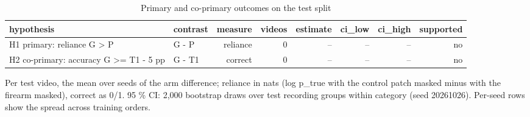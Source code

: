\begin{table}[htbp]
\centering
\scriptsize
\caption{Primary and co-primary outcomes on the test split}\label{tab:R4}
\begin{adjustbox}{max width=\textwidth}
\begin{tabular}{llrrrrrr}
\toprule
hypothesis & contrast & measure & videos & estimate & ci\_\allowbreak{}low & ci\_\allowbreak{}high & supported \\
\midrule
H1 primary: reliance G > P & G - P & reliance & 0 & -- & -- & -- & no \\
H2 co-primary: accuracy G >= T1 - 5 pp & G - T1 & correct & 0 & -- & -- & -- & no \\
\bottomrule
\end{tabular}
\end{adjustbox}
\par\smallskip\parbox{\textwidth}{\footnotesize Per test video, the mean over seeds of the arm difference; reliance in nats (log p\_true with the control patch masked minus with the firearm masked), correct as 0/1. 95 \% CI: 2,000 bootstrap draws over test recording groups within category (seed 20261026). Per-seed rows show the spread across training orders.}
\end{table}
